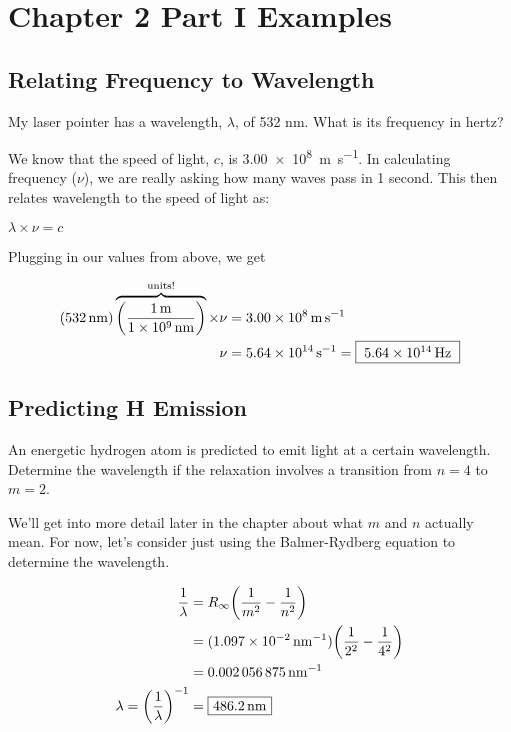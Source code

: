 \documentclass[12pt,letterpaper]{article}
\begin{document}
\section*{Chapter 2 Part I Examples}
\subsection*{Relating Frequency to Wavelength}

My laser pointer has a wavelength, $\lambda$, of 532 nm. What is its frequency
in hertz?

{\color{blue}
We know that the speed of light, $c$, is \SI{3.00e8}{\meter\per\second}. In
calculating frequency ($\nu$), we are really asking how many waves pass in 1
second.  This then relates wavelength to the speed of light as:

\begin{center}
	\begin{math}
		\lambda \times \nu = c
	\end{math}
\end{center}

Plugging in our values from above, we get

\begin{center}
	\begin{align*}
		(\SI{532}{\nano\meter})
		\overbrace{\bigg(\dfrac{\SI{1}{\meter}}{\SI{1e9}{\nano\meter}}\bigg)}^{\text{units!}}
		\times \nu &=
		\SI{3.00e8}{\meter\per\second} \\
		\nu &= \SI{5.64e14}{\per\second} =
		\framebox[1.2\width]{\SI{5.64e14}{\hertz}}
	\end{align*}
\end{center}
}

\subsection*{Predicting H Emission}

An energetic hydrogen atom is predicted to emit light at a certain wavelength.
Determine the wavelength if the relaxation involves a transition from $n=4$ to
$m=2$.

{\color{blue}
We'll get into more detail later in the chapter about what $m$ and $n$ actually
mean. For now, let's consider just using the Balmer-Rydberg equation to
determine the wavelength.

\begin{align*}
	\dfrac{1}{\lambda} &= R_\infty \bigg( \dfrac{1}{m^2} - \dfrac{1}{n^2}
	\bigg) \\
	&= (\SI{1.097e-2}{\per\nano\meter}) \bigg( \dfrac{1}{2^2} - \dfrac{1}{4^2} \bigg) \\
	&= \SI{0.002056875}{\per\nano\meter} \\
	\lambda = \bigg(\dfrac{1}{\lambda}\bigg)^{-1} &=
	\framebox[1.2\width]{\SI{486.2}{\nano\meter}}
\end{align*}}
\end{document}
